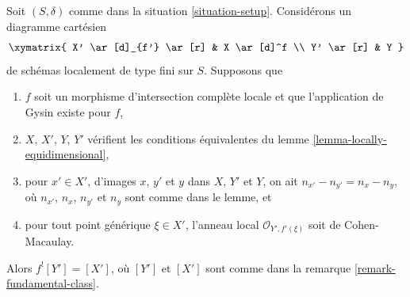 \begin{lemma}
\label{lemma-lci-gysin-easy}
Soit $(S, \delta)$ comme dans la situation \ref{situation-setup}.
Considérons un diagramme cartésien
$$
\xymatrix{
X' \ar[d]_{f'} \ar[r] &
X \ar[d]^f \\
Y' \ar[r] &
Y
}
$$
de schémas localement de type fini sur $S$. Supposons que
\begin{enumerate}
\item $f$ soit un morphisme d'intersection complète locale et que
l'application de Gysin existe pour $f$,
\item $X$, $X'$, $Y$, $Y'$ vérifient les conditions équivalentes du
lemme \ref{lemma-locally-equidimensional},
\item pour $x' \in X'$, d'images $x$, $y'$ et $y$
dans $X$, $Y'$ et $Y$, on ait $n_{x'} - n_{y'} = n_x - n_y$,
où $n_{x'}$, $n_x$, $n_{y'}$ et $n_y$ sont comme dans le lemme, et
\item pour tout point générique $\xi \in X'$, l'anneau local
$\mathcal{O}_{Y', f'(\xi)}$ soit de Cohen-Macaulay.
\end{enumerate}
Alors $f^![Y'] = [X']$, où $[Y']$ et $[X']$ sont comme dans la
remarque \ref{remark-fundamental-class}.
\end{lemma}

